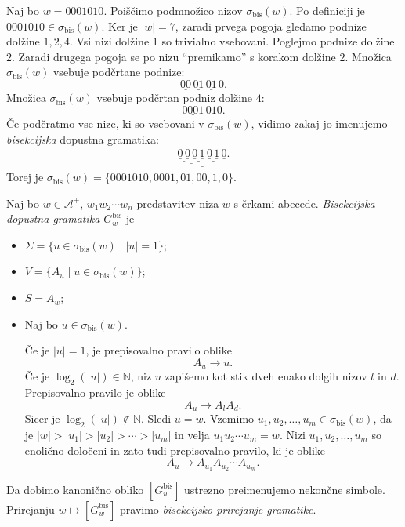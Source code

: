 \documentclass[fin1, tisk]{fmfdelo}
\providecommand{\abs}[1]{\left\lvert #1 \right\rvert}
\newcommand{\N}{\mathbb{N}}
\newcommand{\A}{\mathcal{A}}
\theoremstyle{definition}
\begin{document}
\begin{primer}\label{primer:BisČlenitev}
    Naj bo $w = 0001010$. Poiščimo podmnožico nizov $\sigma_{\text{bis}}(w)$. Po definiciji je 
    $0001010 \in \sigma_{\text{bis}}(w)$. Ker je $\abs{w} = 7$, zaradi prvega pogoja gledamo 
    podnize dolžine $1, 2, 4$. Vsi nizi dolžine $1$ so trivialno vsebovani. Poglejmo podnize 
    dolžine $2$. Zaradi drugega pogoja se po nizu ``premikamo'' s korakom dolžine $2$. Množica
     $\sigma_\text{bis}(w)$ vsebuje podčrtane podnize:
    \[
        \underline{00} \, \underline{01} \, \underline{01} \, 0.
    \]
    Množica $\sigma_\text{bis}(w)$ vsebuje podčrtan podniz dolžine $4$:
    \[
        \underline{0001} \, 010.
    \]
    Če podčratmo vse nize, ki so vsebovani v $\sigma_{\text{bis}}(w)$, vidimo zakaj jo imenujemo
    \emph{bisekcijska} dopustna gramatika:
    \begin{gather}
        \underline{\underline{\underline{\underline{0} \, \underline{0}} \,
        \underline{\underline{0} \, \underline{1}}} \, \underline{\underline{0} \, \underline{1}}
        \, \underline{0}}. \label{gather:podčratno}
    \end{gather}
    Torej je $\sigma_{\text{bis}}(w) = \{ 0001010, 0001, 01, 00, 1, 0 \}$.
\end{primer}

\begin{definicija}
    Naj bo $w \in \A^+$, $w_1w_2 \cdots w_n$ predstavitev niza $w$ s črkami abecede.
    \emph{Bisekcijska dopustna gramatika $G^\text{bis}_w$} je
    \begin{itemize}
        \item $\Sigma = \{ u \in \sigma_{\text{bis}}(w) \mid \abs{u} = 1 \}$;
        \item $V = \{ A_u \mid u \in \sigma_{\text{bis}}(w) \}$;
        \item $S = A_w$;
        \item Naj bo $u \in \sigma_{\text{bis}}(w)$. 
        
        Če je $\abs{u} = 1$, je prepisovalno pravilo oblike
        \[
            A_u \rightarrow u.
        \]
        Če je $\log_2(\abs{u}) \in \N$, niz $u$ zapišemo kot stik dveh enako dolgih nizov $l$ in 
        $d$. Prepisovalno pravilo je oblike
        \[
            A_u \rightarrow A_lA_d.
        \]
        Sicer je $\log_2(\abs{u}) \notin \N$. Sledi $u=w$. Vzemimo 
        $u_1, u_2, \ldots, u_m \in \sigma_{\text{bis}}(w)$, da je 
        $\abs{w} > \abs{u_1} > \abs{u_2} > \cdots > \abs{u_m}$ in velja $u_1u_2 \cdots u_m = w$.
        Nizi $u_1, u_2, \ldots, u_m$ so enolično določeni in zato tudi prepisovalno pravilo, ki
        je oblike
        \[
            A_u \rightarrow A_{u_1}A_{u_2} \cdots A_{u_m}.
        \]
    \end{itemize}
    Da dobimo kanonično obliko $[G^\text{bis}_w]$ ustrezno preimenujemo nekončne simbole.
    Prirejanju $w \mapsto [G^\text{bis}_w]$ pravimo \emph{bisekcijsko prirejanje gramatike}.
\end{definicija}
\end{document}
